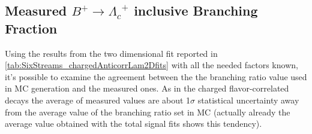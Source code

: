\subsection{Measured $B^+ \rightarrow {\Lambda_c}^+$ inclusive Branching Fraction}
Using the results from the two dimensional fit reported in \cref{tab:SixStreams_chargedAnticorrLam2Dfits} with all the needed factors known, 
it's possible to examine the agreement between the the branching ratio value used in MC generation and the measured ones. %
As in the charged flavor-correlated decays the average of measured values are about 1$\sigma$ statistical uncertainty away from the average value of the branching ratio set in MC 
(actually already the average value obtained with the total signal fits shows this tendency).  





